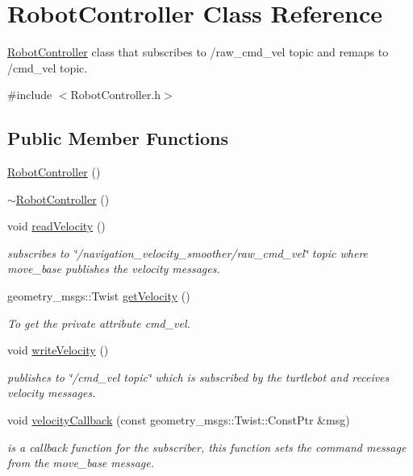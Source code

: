 \hypertarget{classRobotController}{}\section{Robot\+Controller Class Reference}
\label{classRobotController}


\hyperlink{classRobotController}{Robot\+Controller} class that subscribes to /raw\+\_\+cmd\+\_\+vel topic and remaps to /cmd\+\_\+vel topic.  




{\ttfamily \#include $<$Robot\+Controller.\+h$>$}

\subsection*{Public Member Functions}
\begin{DoxyCompactItemize}
\item 
\hyperlink{classRobotController_a1b3379c8c3350b2130f30c8bd23cba33}{Robot\+Controller} ()
\item 
\hyperlink{classRobotController_a4441cd6adf323a0ce3c454dc4f02efaf}{$\sim$\+Robot\+Controller} ()
\item 
void \hyperlink{classRobotController_a3987f42087c62ea2fd82c425ec33a31b}{read\+Velocity} ()
\begin{DoxyCompactList}\small\item\em subscribes to \char`\"{}/navigation\+\_\+velocity\+\_\+smoother/raw\+\_\+cmd\+\_\+vel\char`\"{} topic where move\+\_\+base publishes the velocity messages. \end{DoxyCompactList}\item 
geometry\+\_\+msgs\+::\+Twist \hyperlink{classRobotController_a8016cd41d0d175cc3994f81785bb69ae}{get\+Velocity} ()
\begin{DoxyCompactList}\small\item\em To get the private attribute cmd\+\_\+vel. \end{DoxyCompactList}\item 
void \hyperlink{classRobotController_a14d95aa76b39dbde8a5ff34533ea4634}{write\+Velocity} ()
\begin{DoxyCompactList}\small\item\em publishes to \char`\"{}/cmd\+\_\+vel topic\char`\"{} which is subscribed by the turtlebot and receives velocity messages. \end{DoxyCompactList}\item 
void \hyperlink{classRobotController_a6297a4573ddb0d096f8f247a7add0cf1}{velocity\+Callback} (const geometry\+\_\+msgs\+::\+Twist\+::\+Const\+Ptr \&msg)
\begin{DoxyCompactList}\small\item\em is a callback function for the subscriber, this function sets the command message from the move\+\_\+base message. \end{DoxyCompactList}\end{DoxyCompactItemize}


